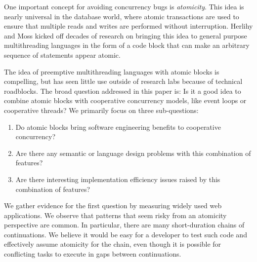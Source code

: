 \documentclass[acmsmall,anonymous,review]{acmart}\settopmatter{printfolios=true,printccs=false,printacmref=false}
\begin{document}

One important concept for avoiding concurrency bugs is \emph{atomicity}.
This idea is nearly universal in the database world, where atomic transactions are used to ensure that multiple reads and writes are performed without interruption.
Herlihy and Moss \cite{Herlihy1993} kicked off decades of research on bringing this idea to general purpose multithreading languages in the form of a code block that can make an arbitrary sequence of statements appear atomic.


The idea of preemptive multithreading languages with atomic blocks is compelling, but has seen little use outside of research labs because of technical roadblocks.
The broad question addressed in this paper is: Is it a good idea to combine atomic blocks with cooperative concurrency models, like event loops or cooperative threads?
We primarily focus on three sub-questions:
\begin{enumerate}
\item Do atomic blocks bring software engineering benefits to cooperative concurrency?
\item Are there any semantic or language design problems with this combination of features?
\item Are there interesting implementation efficiency issues raised by this combination of features?
\end{enumerate}

We gather evidence for the first question by measuring widely used web applications\footnotemark{}.
We observe that patterns that seem risky from an atomicity perspective are common.
In particular, there are many short-duration chains of continuations.
We believe it would be easy for a developer to test such code and effectively assume atomicity for the chain, even though it is possible for conflicting tasks to execute in gaps between continuations.

\end{document}
